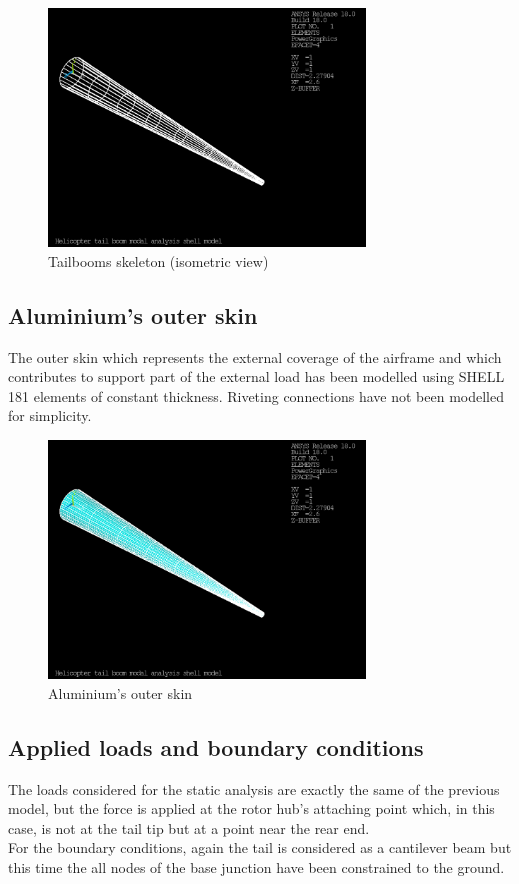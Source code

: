 \begin{figure}[!htb]
	\centering
	\includegraphics[width=0.75\textwidth]{PICTURES/imgs/ShellModel/img/Shellmodel001.png}
	\caption{Tailbooms skeleton (isometric view)}
	\label{fig:Skeleton}
\end{figure}



\subsection*{Aluminium's outer skin}
\noindent
The outer skin which represents the external coverage of the airframe and which contributes to support part of the external load has been modelled using SHELL 181 elements of constant thickness. 
Riveting connections have not been modelled for simplicity.
%
\begin{figure}[!h]
	\centering
	\includegraphics[width=0.75\textwidth]{PICTURES/imgs/ShellModel/img/Shellmodel002.png}
	\caption{Aluminium's outer skin}
	\label{fig:AnsysMeshLump}
\end{figure}
%
\subsection*{Applied loads and boundary conditions}
\noindent
The loads considered for the static analysis are exactly the same of the previous model, but the force is applied at the rotor hub's attaching point which, in this case, is not at the tail tip but at a point near the rear end. \\
For the boundary conditions, again the tail is considered as a cantilever beam but this time the all nodes of the base junction have been constrained to the ground. \\


